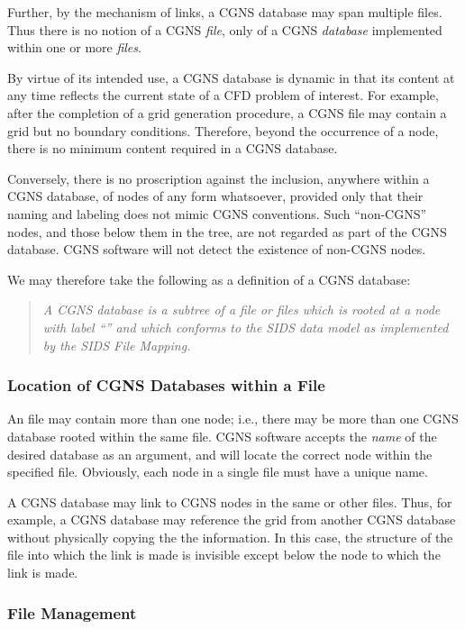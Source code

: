 Further, by the mechanism of links, a CGNS database may span multiple
files. Thus there is no notion of a CGNS \emph{file}, only of a CGNS
\emph{database} implemented within one or more \emph{files}.

By virtue of its intended use, a CGNS database is dynamic in
that its content at any time reflects the current state of a CFD
problem of interest. For example, after the completion of a grid
generation procedure, a CGNS file may contain a grid but no boundary
conditions. Therefore, beyond the occurrence of a 
node, there is no minimum content required in a CGNS database.

Conversely, there is no proscription against the inclusion, anywhere
within a CGNS database, of nodes of any form
whatsoever, provided only that their naming and labeling does not mimic
CGNS conventions. Such ``non-CGNS'' nodes, and those below them in the
tree, are not regarded as part of the CGNS database. CGNS software will
not detect the existence of non-CGNS nodes.

We may therefore take the following as a definition of a CGNS database:
\begin{quote}\itshape%
A CGNS database is a subtree of a file or files which is rooted at
a node with label ``'' and which conforms to the SIDS data
model as implemented by the SIDS File Mapping.
\end{quote}

\subsubsection{Location of CGNS Databases within a File}

An file may contain more than one  node; i.e.,
there may be more than one CGNS database rooted within the same file.
CGNS software accepts the \emph{name} of the desired database as an
argument, and will locate the correct  node within the
specified file.
Obviously, each  node in a single file must have a
unique name.

A CGNS database may link to CGNS nodes in the same or other files.
Thus, for example, a CGNS database may reference the grid from
another CGNS database without physically copying the the information.
In this case, the structure of the file into which the link is made
is invisible except below the node to which the link is made.

\subsubsection{File Management}

